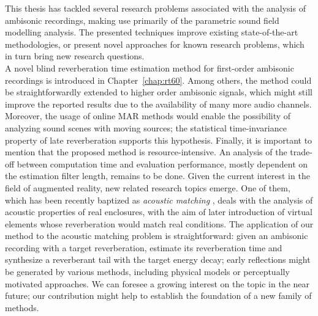 This thesis has tackled several research problems associated with the analysis of ambisonic recordings, making use primarily of the parametric sound field modelling analysis.
The presented techniques improve existing state-of-the-art methodologies, or present novel approaches for known research problems, which in turn bring new research questions. \\

%

A novel blind reverberation time estimation method for first-order ambisonic recordings is introduced in Chapter~\ref{chap:rt60}.
Among others, the method could be straightforwardly extended to higher order ambisonic signals, which might still improve the reported results due to the availability of many more audio channels. 
Moreover, the usage of online MAR methods would enable the possibility of analyzing sound scenes with moving sources; the statistical time-invariance property of late reverberation supports this hypothesis.
Finally, it is important to mention that the proposed method is resource-intensive. An analysis of the trade-off between computation time and evaluation performance, mostly dependent on the estimation filter length, remains to be done.  
\newpage
Given the current interest in the field of augmented reality, new related research topics emerge. One of them, which has been recently baptized as \textit{acoustic matching} \cite{su2020acoustic}, deals with the analysis of acoustic properties of real enclosures, with the aim of later introduction of virtual elements whose reverberation would match real conditions. 
The application of our method to the acoustic matching problem is straightforward: given an ambisonic recording with a target reverberation, estimate its reverberation time and synthesize a reverberant tail with the target energy decay; early reflections might be generated by various methods, including physical models or perceptually motivated approaches. 
We can foresee a growing interest on the topic in the near future; our contribution might help to establish the foundation of a new family of methods. \\


